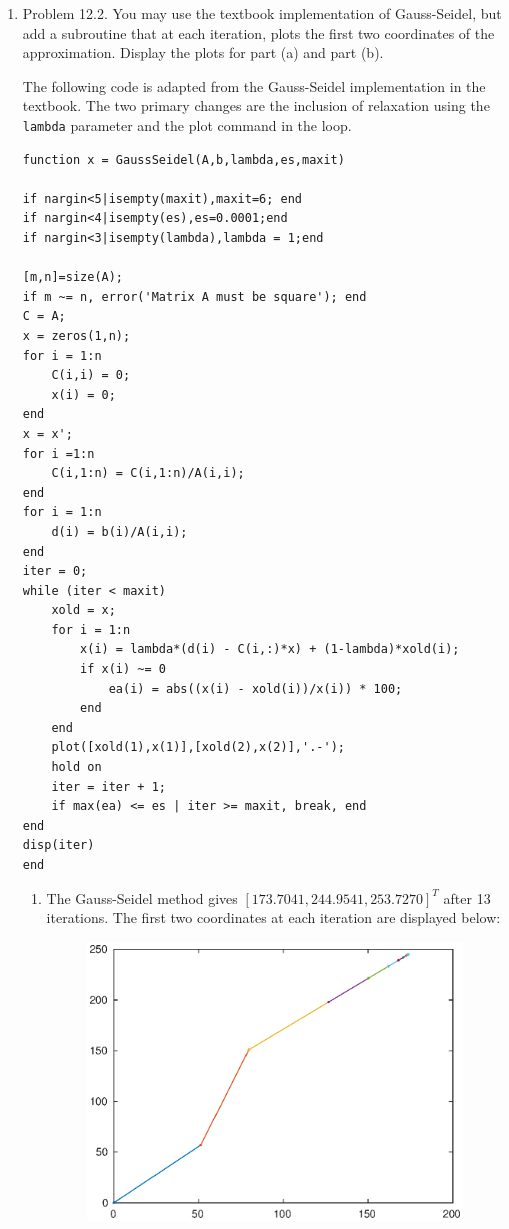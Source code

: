 \documentclass[12pt]{amsart}
\begin{document}
\begin{enumerate}
\vfill
\pagebreak








\item Problem 12.2. You may use the textbook implementation of
Gauss-Seidel, but add a subroutine that at each iteration, plots the
first two coordinates of the approximation.
Display the plots for part (a) and part (b).

\vspace{5mm}

The following code is adapted from the Gauss-Seidel implementation
in the textbook. The two primary changes are the inclusion of
relaxation using the {\tt lambda} parameter and the plot command
in the loop.

\begin{verbatim}
function x = GaussSeidel(A,b,lambda,es,maxit)

if nargin<5|isempty(maxit),maxit=6; end
if nargin<4|isempty(es),es=0.0001;end
if nargin<3|isempty(lambda),lambda = 1;end

[m,n]=size(A);
if m ~= n, error('Matrix A must be square'); end
C = A;
x = zeros(1,n);
for i = 1:n
    C(i,i) = 0;
    x(i) = 0;
end
x = x';
for i =1:n
    C(i,1:n) = C(i,1:n)/A(i,i);
end
for i = 1:n
    d(i) = b(i)/A(i,i);
end
iter = 0;
while (iter < maxit)
    xold = x;
    for i = 1:n
        x(i) = lambda*(d(i) - C(i,:)*x) + (1-lambda)*xold(i);
        if x(i) ~= 0
            ea(i) = abs((x(i) - xold(i))/x(i)) * 100;
        end
    end
    plot([xold(1),x(1)],[xold(2),x(2)],'.-');
    hold on
    iter = iter + 1;
    if max(ea) <= es | iter >= maxit, break, end
end
disp(iter)
end
\end{verbatim}

\begin{enumerate}
\item The Gauss-Seidel method gives $[173.7041, 244.9541, 253.7270]^T$
after 13 iterations. The first two coordinates at each iteration are
displayed below:

\begin{figure}[h!]
\includegraphics[width=.8\textwidth]{gaussSeidel1.eps}
\end{figure}


\end{enumerate}
\end{enumerate}
\end{document}
